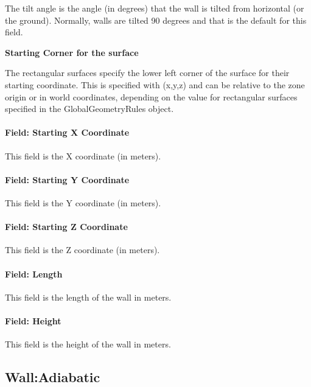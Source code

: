 The tilt angle is the angle (in degrees) that the wall is tilted from horizontal (or the ground). Normally, walls are tilted 90 degrees and that is the default for this field.

\begin{callout}
\textbf{Starting Corner for the surface}

The rectangular surfaces specify the lower left corner of the surface for their starting coordinate. This is specified with (x,y,z) and can be relative to the zone origin or in world coordinates, depending on the value for rectangular surfaces specified in the GlobalGeometryRules object.
\end{callout}

\paragraph{Field: Starting X Coordinate}\label{field-starting-x-coordinate}

This field is the X coordinate (in meters).

\paragraph{Field: Starting Y Coordinate}\label{field-starting-y-coordinate}

This field is the Y coordinate (in meters).

\paragraph{Field: Starting Z Coordinate}\label{field-starting-z-coordinate}

This field is the Z coordinate (in meters).

\paragraph{Field: Length}\label{field-length-000}

This field is the length of the wall in meters.

\paragraph{Field: Height}\label{field-height-000}

This field is the height of the wall in meters.

\subsection{Wall:Adiabatic}\label{walladiabatic}

